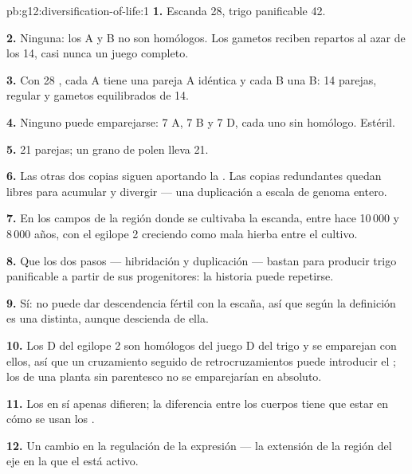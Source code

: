 \begin{solution}{pb:g12:diversification-of-life:1}
\textbf{1.} Escanda 28, trigo panificable 42.

\textbf{2.} Ninguna: los  A y B no son homólogos. Los gametos
reciben repartos al azar de los 14, casi nunca un juego completo.

\textbf{3.} Con 28 , cada A tiene una pareja A idéntica y
cada B una B: 14 parejas,  regular y gametos equilibrados de 14.

\textbf{4.} Ninguno puede emparejarse: 7  A, 7 B y 7 D, cada
uno sin homólogo. Estéril.

\textbf{5.} 21 parejas; un grano de polen lleva 21.

\textbf{6.} Las otras dos copias siguen aportando la . Las
copias redundantes quedan libres para acumular  y divergir
--- una duplicación a escala de genoma entero.

\textbf{7.} En los campos de la región donde se cultivaba la escanda,
entre hace 10\,000 y 8\,000 años, con el egilope 2 creciendo como mala
hierba entre el cultivo.

\textbf{8.} Que los dos pasos --- hibridación y duplicación --- bastan
para producir trigo panificable a partir de sus progenitores: la
historia puede repetirse.

\textbf{9.} Sí: no puede dar descendencia fértil con la escaña, así que
según la definición es una  distinta, aunque descienda de ella.

\textbf{10.} Los  D del egilope 2 son homólogos del juego D
del trigo y se emparejan con ellos, así que un cruzamiento seguido de
retrocruzamientos puede introducir el ; los  de una planta
sin parentesco no se emparejarían en absoluto.

\textbf{11.} Los  en sí apenas difieren; la diferencia entre los
cuerpos tiene que estar en cómo se usan los .

\textbf{12.} Un cambio en la regulación de la expresión --- la
extensión de la región del eje en la que el  está activo.


\end{solution}

